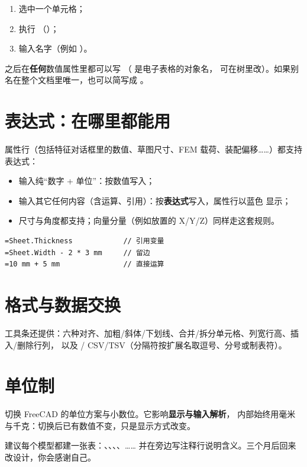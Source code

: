 \begin{enumerate}
  \item 选中一个单元格；
  \item 执行 （）；
  \item 输入名字（例如 ）。
\end{enumerate}

之后在\textbf{任何}数值属性里都可以写 （ 是电子表格的对象名，
可在树里改）。如果别名在整个文档里唯一，也可以简写成 。

\section{表达式：在哪里都能用}

属性行（包括特征对话框里的数值、草图尺寸、FEM 载荷、装配偏移……）都支持表达式：

\begin{itemize}
  \item 输入纯“数字 + 单位”：按数值写入；
  \item 输入其它任何内容（含运算、引用）：按\textbf{表达式}写入，属性行以蓝色  显示；
  \item 尺寸与角度都支持；向量分量（例如放置的 X/Y/Z）同样走这套规则。
\end{itemize}

\begin{lstlisting}
=Sheet.Thickness            // 引用变量
=Sheet.Width - 2 * 3 mm     // 留边
=10 mm + 5 mm               // 直接运算
\end{lstlisting}

\section{格式与数据交换}

工具条还提供：六种对齐、加粗/斜体/下划线、合并/拆分单元格、列宽行高、插入/删除行列，
以及 / CSV/TSV（分隔符按扩展名取逗号、分号或制表符）。

\section{单位制}

 切换 FreeCAD 的单位方案与小数位。它影响\textbf{显示与输入解析}，
内部始终用毫米与千克：切换后已有数值不变，只是显示方式改变。

\begin{tip}
建议每个模型都建一张表：、、、、……
并在旁边写注释行说明含义。三个月后回来改设计，你会感谢自己。
\end{tip}

